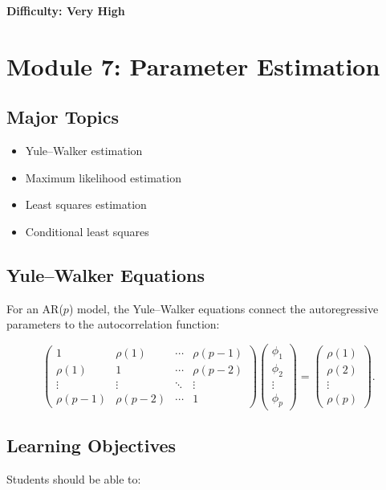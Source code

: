 \documentclass[11pt]{article}
\begin{document}
\textbf{Difficulty: Very High}

\section{Module 7: Parameter Estimation}

\subsection{Major Topics}

\begin{itemize}
    \item Yule--Walker estimation
    \item Maximum likelihood estimation
    \item Least squares estimation
    \item Conditional least squares
\end{itemize}

\subsection{Yule--Walker Equations}

For an AR($p$) model, the Yule--Walker equations connect the
autoregressive parameters to the autocorrelation function:

\[
\begin{pmatrix}
1 & \rho(1) & \cdots & \rho(p-1)\\
\rho(1) & 1 & \cdots & \rho(p-2)\\
\vdots & \vdots & \ddots & \vdots\\
\rho(p-1)&\rho(p-2)&\cdots&1
\end{pmatrix}
\begin{pmatrix}
\phi_1\\
\phi_2\\
\vdots\\
\phi_p
\end{pmatrix}
=
\begin{pmatrix}
\rho(1)\\
\rho(2)\\
\vdots\\
\rho(p)
\end{pmatrix}.
\]

\subsection{Learning Objectives}

Students should be able to:
\end{document}

